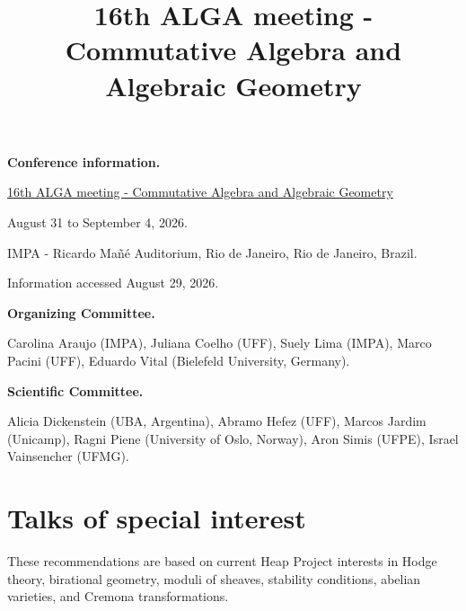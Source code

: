 


\title{16th ALGA meeting -
Commutative Algebra and
Algebraic Geometry}
\maketitle
{}
\label{section-phantom}
\tableofcontents

\medskip\noindent
{\bf Conference information.}

\href{%
https://impa.br/evento/%
16th-alga-meeting-commutative-algebra-%
and-algebraic-geometry/%
}{16th ALGA meeting -
Commutative Algebra and
Algebraic Geometry}

August 31 to September 4, 2026.

IMPA - Ricardo Ma\~n\'e Auditorium,
Rio de Janeiro,
Rio de Janeiro, Brazil.

Information accessed August 29, 2026.

\medskip\noindent
{\bf Organizing Committee.}

Carolina Araujo (IMPA),
Juliana Coelho (UFF),
Suely Lima (IMPA),
Marco Pacini (UFF),
Eduardo Vital
(Bielefeld University, Germany).

\medskip\noindent
{\bf Scientific Committee.}

Alicia Dickenstein (UBA, Argentina),
Abramo Hefez (UFF),
Marcos Jardim (Unicamp),
Ragni Piene
(University of Oslo, Norway),
Aron Simis (UFPE),
Israel Vainsencher (UFMG).

\section{Talks of special interest}
\label{section-talks-special-interest}

These recommendations are based on current
Heap Project interests in Hodge theory,
birational geometry, moduli of sheaves,
stability conditions, abelian varieties,
and Cremona transformations.

